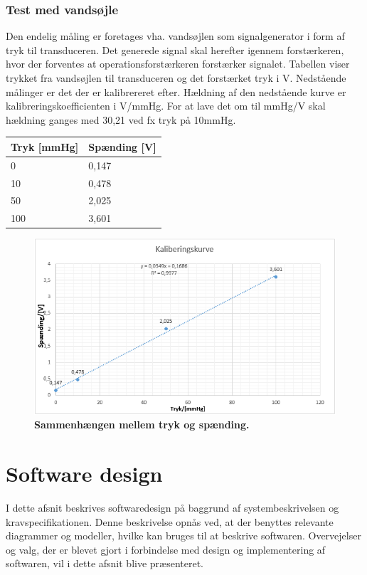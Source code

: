 \subsubsection{Test med vandsøjle}
Den endelig måling er foretages vha. vandsøjlen som signalgenerator i form af tryk til transduceren. Det generede signal skal herefter igennem forstærkeren, hvor der forventes at operationsforstærkeren forstærker signalet. Tabellen viser trykket fra vandsøjlen til transduceren og det forstærket tryk i V. Nedstående målinger er det der er kalibrereret efter. Hældning af den nedstående kurve er kalibreringskoefficienten i V/mmHg. For at lave det om til mmHg/V skal hældning ganges med 30,21 ved fx tryk på 10mmHg. 
\begin{table}[H]
\label{tab:tabel2}
\begin{tabular}{| l | l |}
   \hline
   Tryk [mmHg] & Spænding [V] \\ \hline
   0 & 0,147 \\ \hline
   10 & 0,478\\ \hline
   50 & 2,025 \\ \hline
   100 & 3,601\\\hline
\end{tabular}
\end{table}
\begin{figure}[H]
\includegraphics[width =1.0\textwidth , center]{billeder/vandsojleTest}
\caption{\textbf{Sammenhængen mellem tryk og spænding.}}
\end{figure}
\newpage
\section{Software design}
I dette afsnit beskrives softwaredesign på baggrund af systembeskrivelsen og kravspecifikationen. Denne beskrivelse opnås ved, at der benyttes relevante diagrammer og modeller, hvilke kan bruges til at beskrive softwaren. Overvejelser og valg, der er blevet gjort i forbindelse med design og implementering af softwaren, vil i dette afsnit blive præsenteret.
